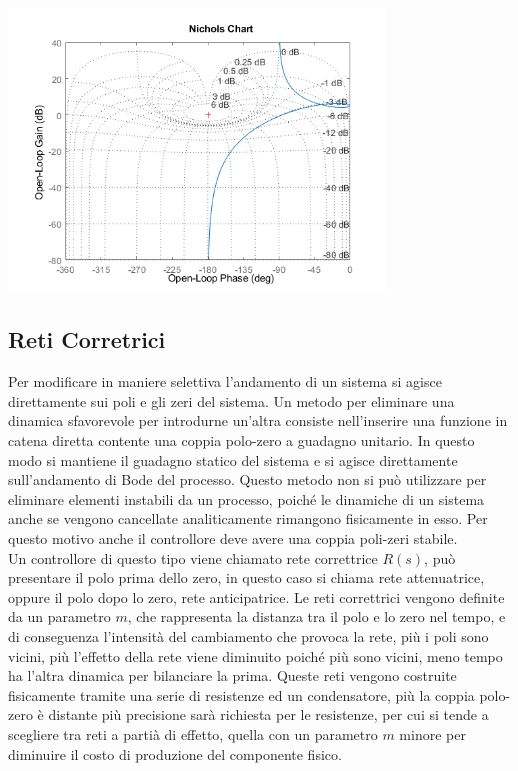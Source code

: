 \documentclass{article}
\numberwithin{equation}{subsection}
\begin{document}
\begin{center}
    \includegraphics[width=10cm]{Nichols1.png}
\end{center}

\subsection{Reti Corretrici}

Per modificare in maniere selettiva l'andamento di un sistema si agisce direttamente sui poli e gli zeri del sistema. Un metodo per eliminare una dinamica sfavorevole per 
introdurne un'altra consiste nell'inserire una funzione in catena diretta contente una coppia polo-zero a guadagno unitario. In questo modo si mantiene il guadagno statico 
del sistema e si agisce direttamente sull'andamento di Bode del processo. Questo metodo non si può utilizzare per eliminare elementi instabili da un processo, poiché le 
dinamiche di un sistema anche se vengono cancellate analiticamente rimangono fisicamente in esso. Per questo motivo anche il controllore deve avere una coppia poli-zeri 
stabile. \\

Un controllore di questo tipo viene chiamato rete correttrice $R(s)$, può presentare il polo prima dello zero, in questo caso si chiama rete attenuatrice, oppure il polo 
dopo lo zero, rete anticipatrice. Le reti correttrici vengono definite da un parametro $m$, che rappresenta la distanza tra il polo e lo zero nel tempo, e di conseguenza 
l'intensità del cambiamento che provoca la rete, più i poli sono vicini, più l'effetto della rete viene diminuito poiché più sono vicini, meno tempo ha l'altra dinamica 
per bilanciare la prima. Queste reti vengono costruite fisicamente tramite una serie di resistenze ed un condensatore, più la coppia polo-zero è distante più precisione sarà richiesta per le 
resistenze, per cui si tende a scegliere tra reti a partià di effetto, quella con un parametro $m$ minore per diminuire il costo di produzione del componente fisico. \\
\end{document}
